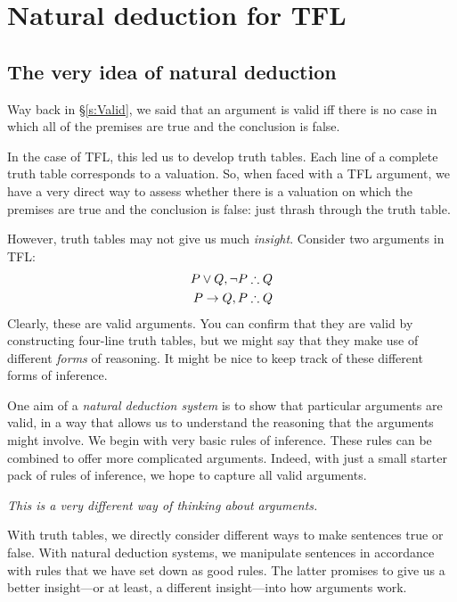 \part{Natural deduction for TFL}
\label{ch.NDTFL}

\chapter{The very idea of natural deduction}\label{s:NDVeryIdea}

Way back in \S\ref{s:Valid}, we said that an argument is valid iff there is no case in which all of the premises are true and the conclusion is false. 

In the case of TFL, this led us to develop truth tables. Each line of a complete truth table corresponds to a valuation. So, when faced with a TFL argument, we have a very direct way to assess whether there is a valuation on which the premises are true and the conclusion is false: just thrash through the truth table.

However, truth tables may not give us much \emph{insight}. Consider two arguments in TFL:
\begin{align*}
P \eor Q, \enot P & \therefore Q\\
P \eif Q, P & \therefore Q
\end{align*}
Clearly, these are valid arguments. You can confirm that they are valid by constructing four-line truth tables, but we might say that they make use of different \emph{forms} of reasoning. It might be nice to keep track of these different forms of inference. 

One aim of a \emph{natural deduction system} is to show that particular arguments are valid, in a way that allows us to understand the reasoning that the arguments might involve. We begin with very basic rules of inference. These rules can be combined to offer more complicated arguments. Indeed, with just a small starter pack of rules of inference, we hope to capture all valid arguments. 

\emph{This is a very different way of thinking about arguments.} 

With truth tables, we directly consider different ways to make sentences true or false. With natural deduction systems, we manipulate sentences in accordance with rules that we have set down as good rules. The latter promises to give us a better insight---or at least, a different insight---into how arguments work.

